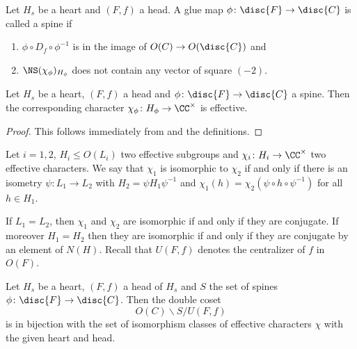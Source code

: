 \begin{definition}\label{spines}
Let $H_s$ be a heart and $(F,f)$ a head.
A glue map $\phi \colon \disc{F} \to \disc{C}$ is called a spine if
\begin{enumerate}
 \item  $\phi \circ  D_f \circ \phi^{-1}$ is in the image of $O(C) \to O(\disc{C})$ and
 \item  $\NS(\chi_\phi)_{H_\phi}$ does not contain any vector of square $(-2)$.
\end{enumerate}
\end{definition}

\begin{proposition}\label{effectivespine}
 Let $H_s$ be a heart, $(F,f)$ a head and $\phi\colon \disc{F} \to \disc{C}$ a spine.
 Then the corresponding character $\chi_\phi \colon H_\phi \to \CC^\times$ is effective.
\end{proposition}
\begin{proof}
This follows immediately from  and the definitions.
\end{proof}
\begin{definition}
Let $i=1,2$, $H_i \leq O(L_i)$ two effective subgroups and
$\chi_i\colon H_i \to \CC^\times$ two effective characters.
We say that $\chi_1$ is isomorphic to $\chi_2$ if and only if there is an isometry $\psi \colon L_1 \to L_2$ with $H_2 = \psi H_1 \psi^{-1}$ and $\chi_1(h) = \chi_2(\psi \circ h \circ \psi^{-1})$ for all $h \in H_1$.
\end{definition}
If $L_1=L_2$, then $\chi_1$ and $\chi_2$ are isomorphic if and only if they are conjugate.
If moreover $H_1=H_2$ then they are isomorphic if and only if they are conjugate by an element of $N(H)$.
Recall that $U(F,f)$ denotes the centralizer of $f$ in $O(F)$.
\begin{theorem}\label{fiber}
Let $H_s$ be a heart, $(F,f)$ a head of $H_s$ and $S$ the set of spines
$\phi \colon \disc{F} \to \disc{C}$.
Then the double coset
\[O(C) \backslash S / U(F,f)\]
is in bijection with the set of isomorphism classes of effective characters $\chi$ with the given heart and head.
\end{theorem}
